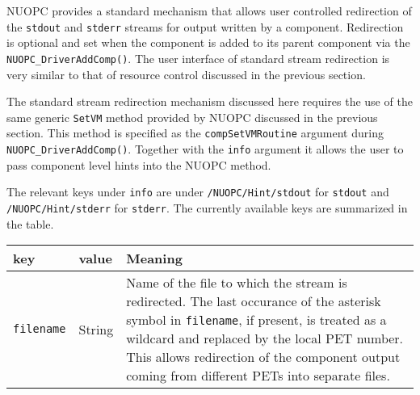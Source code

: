 %

\label{StdRedirect}

NUOPC provides a standard mechanism that allows user controlled redirection of the {\tt stdout} and {\tt stderr} streams for output written by a component. Redirection is optional and set when the component is added to its parent component via the {\tt NUOPC\_DriverAddComp()}. The user interface of standard stream redirection is very similar to that of resource control discussed in the previous section.

The standard stream redirection mechanism discussed here requires the use of the same generic {\tt SetVM} method provided by NUOPC discussed in the previous section. This method is specified as the {\tt compSetVMRoutine} argument during {\tt NUOPC\_DriverAddComp()}. Together with the {\tt info} argument it allows the user to pass component level hints into the NUOPC method.

The relevant keys under {\tt info} are under {\tt /NUOPC/Hint/stdout} for {\tt stdout} and {\tt /NUOPC/Hint/stderr} for {\tt stderr}. The currently available keys are summarized in the table.

\vspace*{2ex}
\begin{longtable}[h]{|p{}|p{}|p{}|}
     \hline\hline
     {\bf key} & {\bf value} & {\bf Meaning}\\
     \hline\hline

     {\tt filename}         & String    &
        Name of the file to which the stream is redirected.
        The last occurance of the asterisk symbol {\tt *} in {\tt filename}, if
        present, is treated as a wildcard and replaced by the local PET number.
        This allows redirection of the component output coming from different            PETs into separate files.
     \\ \hline\hline

\end{longtable}

